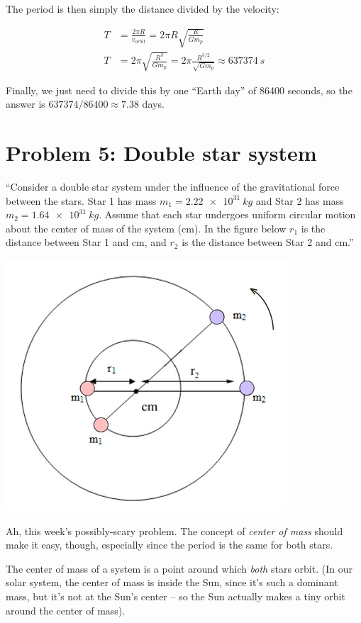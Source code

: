 \documentclass[8.01x]{subfiles}
\begin{document}
The period is then simply the distance divided by the velocity:

\begin{align}
T &= \frac{2 \pi R}{v_{orbit}} = 2 \pi R \sqrt{\frac{R}{G m_p}}\\
T &= 2 \pi \sqrt{\frac{R^3}{G m_p}} = 2 \pi \frac{R^{3/2}}{\sqrt{G m_p}} \approx \SI{637374}{s}
\end{align}

Finally, we just need to divide this by one ``Earth day'' of 86400 seconds, so the answer is $637374/86400 \approx 7.38$ days.

\section{Problem 5: Double star system}

``Consider a double star system under the influence of the gravitational force between the stars. Star 1 has mass $m_1 = \SI{2.22e31}{kg}$ and Star 2 has mass $m_2 = \SI{1.64e31}{kg}$. Assume that each star undergoes uniform circular motion about the center of mass of the system (cm). In the figure below $r_1$ is the distance between Star 1 and cm, and $r_2$ is the distance between Star 2 and cm.''

\begin{center}
\includegraphics[scale=0.65]{Graphics/h5p5}
\end{center}

Ah, this week's possibly-scary problem. The concept of \emph{center of mass} should make it easy, though, especially since the period is the same for both stars.

The center of mass of a system is a point around which \emph{both} stars orbit. (In our solar system, the center of mass is inside the Sun, since it's such a dominant mass, but it's not at the Sun's center -- so the Sun actually makes a tiny orbit around the center of mass).
\end{document}
